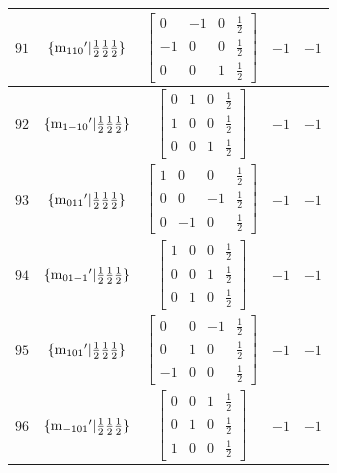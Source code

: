 \documentclass[fleqn,8pt]{jsarticle}
\begin{document}
\begin{longtable}{ccccc}
$ 91 $ & $ \{{\rm m}_{110}{}'|\frac{1}{2} \frac{1}{2} \frac{1}{2}\} $ & $ \begin{bmatrix} 0 & -1 & 0 & \frac{1}{2} \\ -1 & 0 & 0 & \frac{1}{2} \\ 0 & 0 & 1 & \frac{1}{2} \end{bmatrix} $ & $ -1 $ & $ -1 $ \\ \hline
$ 92 $ & $ \{{\rm m}_{1-10}{}'|\frac{1}{2} \frac{1}{2} \frac{1}{2}\} $ & $ \begin{bmatrix} 0 & 1 & 0 & \frac{1}{2} \\ 1 & 0 & 0 & \frac{1}{2} \\ 0 & 0 & 1 & \frac{1}{2} \end{bmatrix} $ & $ -1 $ & $ -1 $ \\ \hline
$ 93 $ & $ \{{\rm m}_{011}{}'|\frac{1}{2} \frac{1}{2} \frac{1}{2}\} $ & $ \begin{bmatrix} 1 & 0 & 0 & \frac{1}{2} \\ 0 & 0 & -1 & \frac{1}{2} \\ 0 & -1 & 0 & \frac{1}{2} \end{bmatrix} $ & $ -1 $ & $ -1 $ \\ \hline
$ 94 $ & $ \{{\rm m}_{01-1}{}'|\frac{1}{2} \frac{1}{2} \frac{1}{2}\} $ & $ \begin{bmatrix} 1 & 0 & 0 & \frac{1}{2} \\ 0 & 0 & 1 & \frac{1}{2} \\ 0 & 1 & 0 & \frac{1}{2} \end{bmatrix} $ & $ -1 $ & $ -1 $ \\ \hline
$ 95 $ & $ \{{\rm m}_{101}{}'|\frac{1}{2} \frac{1}{2} \frac{1}{2}\} $ & $ \begin{bmatrix} 0 & 0 & -1 & \frac{1}{2} \\ 0 & 1 & 0 & \frac{1}{2} \\ -1 & 0 & 0 & \frac{1}{2} \end{bmatrix} $ & $ -1 $ & $ -1 $ \\ \hline
$ 96 $ & $ \{{\rm m}_{-101}{}'|\frac{1}{2} \frac{1}{2} \frac{1}{2}\} $ & $ \begin{bmatrix} 0 & 0 & 1 & \frac{1}{2} \\ 0 & 1 & 0 & \frac{1}{2} \\ 1 & 0 & 0 & \frac{1}{2} \end{bmatrix} $ & $ -1 $ & $ -1 $ \\
\end{longtable}
\end{document}
